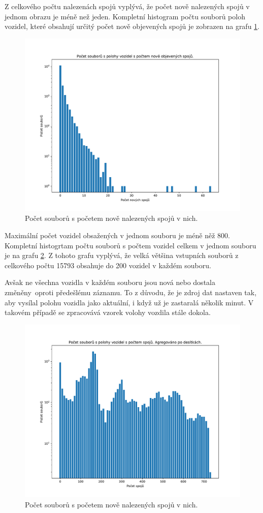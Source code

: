 \bigbreak

Z celkového počtu nalezenách spojů vyplývá, že počet nově nalezených spojů v jednom obrazu je méně než jeden. Kompletní histogram počtu souborů poloh vozidel, které obsahují určitý počet nově objevených spojů je zobrazen na grafu \ref{fig:vehicle_pos_x_new_trips}.

\begin{figure}
	\centering
  \includegraphics[width=0.7\linewidth]{../img/vehicle_pos_x_new_trips}
  \caption{Počet souborů s početem nově nalezených spojů v nich.}
  \label{fig:vehicle_pos_x_new_trips}
\end{figure}

\bigbreak

Maximální počet vozidel obsažených v jednom souboru je méně něž 800. Kompletní histogrtam počtu souborů s počtem vozidel celkem v jednom souboru je na grafu \ref{fig:vehicle_pos_x_all_trips}. Z tohoto grafu vyplývá, že velká většina vstupních souborů z celkového počtu 15793 obsahuje do 200 vozidel v každém souboru.

\bigbreak

Avšak ne všechna vozidla v každém souboru jsou nová nebo dostala změněny oproti předešlému záznamu. To z důvodu, že je zdroj dat nastaven tak, aby vysílal polohu vozidla jako aktuální, i když už je zastaralá několik minut. V takovém případě se zpracovává vzorek volohy vozdila stále dokola.

\begin{figure}
	\centering
  \includegraphics[width=0.7\linewidth]{../img/vehicle_pos_x_all_trips}
  \caption{Počet souborů s početem nově nalezených spojů v nich.}
  \label{fig:vehicle_pos_x_all_trips}
\end{figure}

